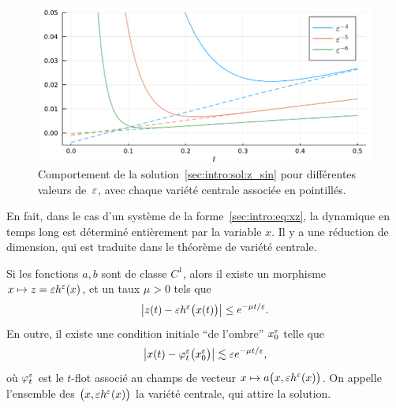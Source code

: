 \begin{figure}[!h]
    \centering
    \includegraphics[width=.9\textwidth]{./Presentation/z_sin.pdf}
    \caption{Comportement de la solution~\eqref{sec:intro:sol:z_sin} pour différentes valeurs de~$\varepsilon$, avec chaque variété centrale associée en pointillés.}
\end{figure}


En fait, dans le cas d'un système de la forme~\eqref{sec:intro:eq:xz}, la dynamique en temps long est déterminé entièrement par la variable $x$. Il y a une réduction de dimension, qui est traduite dans le théorème de variété centrale. 
\begin{FRtheorem*}
    Si les fonctions $a,b$ sont de classe $C^1$, alors il existe un morphisme $x \mapsto z = \varepsilon h^{\varepsilon}(x)$, et un taux $\mu > 0$ tels que 
    \begin{equation*}
        \left| z(t) - \varepsilon h^{\varepsilon}\big( x(t) \big) \right|
        \leq e^{-\mu t/\varepsilon} .
    \end{equation*}
    En outre, il existe une condition initiale \enquote{de l'ombre} $x_0^{\varepsilon}$ telle que 
    \begin{equation*}
        \big| x(t) - \varphi_t^{\varepsilon} \big( x_0^{\varepsilon} \big) \big| 
        \lesssim \varepsilon e^{-\mu t/\varepsilon} , 
    \end{equation*}
    où $\varphi^{\varepsilon}_t$ est le $t$-flot associé au champs de vecteur $x \mapsto a\big(x, \varepsilon h^{\varepsilon}(x) \big)$. On appelle l'ensemble des $\big( x, \varepsilon h^{\varepsilon}(x) \big)$ la variété centrale, qui attire la solution. 
\end{FRtheorem*}

